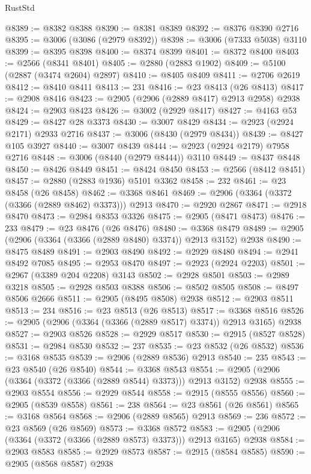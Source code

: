 \begin{lexlean}{RustStd}
\begin{coremodule}
{\begin{coremodule}
{{{{{{{{{{{{{{{{{{{{{{{{{{{{{{{{{{{{{{{{{{{{{{{{{{{{{{{{{{{{{{{{{{{{{{{{{{{{{{@8389 := @8382 @8388
@8390 := @8381 @8389
@8392 := @8376 @8390 @2716
@8395 := @3006 (@3086 (@2979 @8392))
@8398 := @3006 (@7333 @5038) @3110
@8399 := @8395 @8398
@8400 := @8374 @8399
@8401 := @8372 @8400
@8403 := @2566 (@8341 @8401)
@8405 := @2880 (@2883 @1902)
@8409 := @5100 (@2887 (@3474 @2604) @2897)
@8410 := @8405 @8409
@8411 := @2706 @2619
@8412 := @8410 @8411
@8413 := 231
@8416 := @23 @8413 (@26 @8413)
@8417 := @2908 @8416
@8423 := @2905 (@2906 (@2889 @8417) @2913 @2958) @2938
@8424 := @2903 @8423
@8426 := @3002 (@2929 @8417)
@8427 := @4163 @53
@8429 := @8427 @28 @3373
@8430 := @3007 @8429
@8434 := @2923 (@2924 @2171) @2933 @2716
@8437 := @3006 (@8430 (@2979 @8434))
@8439 := @8427 @105 @3927
@8440 := @3007 @8439
@8444 := @2923 (@2924 @2179) @7958 @2716
@8448 := @3006 (@8440 (@2979 @8444)) @3110
@8449 := @8437 @8448
@8450 := @8426 @8449
@8451 := @8424 @8450
@8453 := @2566 (@8412 @8451)
@8457 := @2880 (@2883 @1936) @5101 @3362
@8458 := 232
@8461 := @23 @8458 (@26 @8458)
@8462 := @3368 @8461
@8469 := @2906 (@3364 (@3372 (@3366 (@2889 @8462) @3373))) @2913
@8470 := @2920 @2867
@8471 := @2918 @8470
@8473 := @2984 @8353 @3326
@8475 := @2905 (@8471 @8473)
@8476 := 233
@8479 := @23 @8476 (@26 @8476)
@8480 := @3368 @8479
@8489 := @2905 (@2906 (@3364 (@3366 (@2889 @8480) @3374)) @2913 @3152) @2938
@8490 := @8475 @8489
@8491 := @2903 @8490
@8492 := @2929 @8480
@8494 := @2941 @8492 @7085
@8495 := @2953 @8470
@8497 := @2923 (@2924 @2203)
@8501 := @2967 (@3389 @204 @2208) @3143
@8502 := @2928 @8501
@8503 := @2989 @3218
@8505 := @2928 @8503 @8388
@8506 := @8502 @8505
@8508 := @8497 @8506 @2666
@8511 := @2905 (@8495 @8508) @2938
@8512 := @2903 @8511
@8513 := 234
@8516 := @23 @8513 (@26 @8513)
@8517 := @3368 @8516
@8526 := @2905 (@2906 (@3364 (@3366 (@2889 @8517) @3374)) @2913 @3165) @2938
@8527 := @2903 @8526
@8528 := @2929 @8517
@8530 := @2915 (@8527 @8528)
@8531 := @2984 @8530
@8532 := 237
@8535 := @23 @8532 (@26 @8532)
@8536 := @3168 @8535
@8539 := @2906 (@2889 @8536) @2913
@8540 := 235
@8543 := @23 @8540 (@26 @8540)
@8544 := @3368 @8543
@8554 := @2905 (@2906 (@3364 (@3372 (@3366 (@2889 @8544) @3373))) @2913 @3152) @2938
@8555 := @2903 @8554
@8556 := @2929 @8544
@8558 := @2915 (@8555 @8556)
@8560 := @2905 (@8539 @8558)
@8561 := 238
@8564 := @23 @8561 (@26 @8561)
@8565 := @3168 @8564
@8568 := @2906 (@2889 @8565) @2913
@8569 := 236
@8572 := @23 @8569 (@26 @8569)
@8573 := @3368 @8572
@8583 := @2905 (@2906 (@3364 (@3372 (@3366 (@2889 @8573) @3373))) @2913 @3165) @2938
@8584 := @2903 @8583
@8585 := @2929 @8573
@8587 := @2915 (@8584 @8585)
@8590 := @2905 (@8568 @8587) @2938
}}}}}}}}}}}}}}}}}}}}}}}}}}}}}}}}}}}}}}}}}}}}}}}}}}}}}}}}}}}}}}}}}}}}}}}}}}}}}}
\end{coremodule}}
\end{coremodule}
\end{lexlean}
